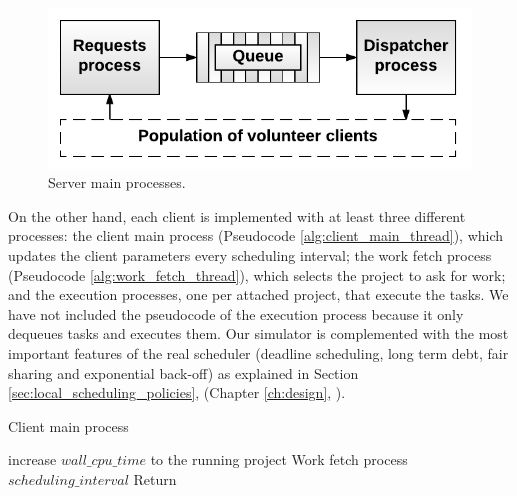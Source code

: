\clearpage

\begin{figure}[htbp]
 	\centering
 	\includegraphics[width=12.5cm]{figures/server_processes}
 	\caption{Server main processes.}
	\label{fig:server_processes}
\end{figure}

\vspace{1cm}

On the other hand, each client is implemented with at least three different processes: the client main process (Pseudocode \ref{alg:client_main_thread}), which updates the client parameters every \gls{scheduling} interval; the work fetch process (Pseudocode \ref{alg:work_fetch_thread}), which selects the project to ask for work; and the execution processes, one per attached project, that execute the tasks. We have not included the pseudocode of the execution process because it only dequeues tasks and executes them. Our simulator is complemented with the most important features of the real scheduler (deadline \gls{scheduling}, long term debt, fair sharing and exponential back-off) as explained in Section \ref{sec:local_scheduling_policies}, \textit{} (Chapter \ref{ch:design}, \textit{}).

\vspace{1cm}

\begin{algorithm}[h]
	\caption{Client main process}
	\label{alg:client_main_thread}
  	\scriptsize
	\begin{algorithmic}[1]
		\State increase $wall\_cpu\_time$ to the running project
		\State {}
		\State {}
		\State {}
		\State {} Work fetch process
		\State {} $scheduling\_interval$
		\EndWhile	
		\State Return
		\EndFunction
	\end{algorithmic}
\end{algorithm}

